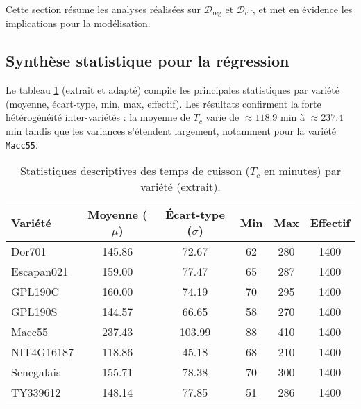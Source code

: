 Cette section résume les analyses réalisées sur \(\mathcal{D}_{\text{reg}}\) et \(\mathcal{D}_{\text{clf}}\), et met en évidence les implications pour la modélisation.

\subsection{Synthèse statistique pour la régression}

Le tableau \ref{tab:stats_descriptives} (extrait et adapté) compile les principales statistiques par variété (moyenne, écart-type, min, max, effectif). Les résultats confirment la forte hétérogénéité inter-variétés : la moyenne de \(T_c\) varie de \(\approx 118.9\) min à \(\approx 237.4\) min tandis que les variances s'étendent largement, notamment pour la variété \texttt{Macc55}.

\begin{table}[H]
    \centering
    \caption{Statistiques descriptives des temps de cuisson ($T_c$ en minutes) par variété (extrait).}
    \label{tab:stats_descriptives}
    \begin{tabular}{lccccc}
        \toprule
        \textbf{Variété} & \textbf{Moyenne ($\mu$)} & \textbf{Écart-type ($\sigma$)} & \textbf{Min} & \textbf{Max} & \textbf{Effectif} \\ \midrule
        Dor701           & 145.86                   & 72.67                          & 62           & 280          & 1400              \\
        Escapan021       & 159.00                   & 77.47                          & 65           & 287          & 1400              \\
        GPL190C          & 160.00                   & 74.19                          & 70           & 295          & 1400              \\
        GPL190S          & 144.57                   & 66.65                          & 58           & 270          & 1400              \\
        Macc55           & 237.43                   & 103.99                         & 88           & 410          & 1400              \\
        NIT4G16187       & 118.86                   & 45.18                          & 68           & 210          & 1400              \\
        Senegalais       & 155.71                   & 78.38                          & 70           & 300          & 1400              \\
        TY339612         & 148.14                   & 77.85                          & 51           & 286          & 1400              \\ \bottomrule
    \end{tabular}
\end{table}

